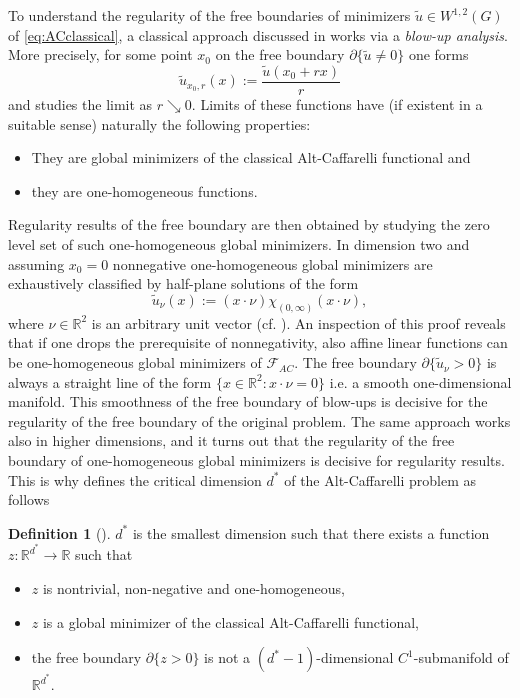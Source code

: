 \documentclass[twoside,11pt]{article}
\theoremstyle{definition}
\newtheorem{definition}{Definition}
\begin{document}
To understand the regularity of the free boundaries of minimizers $\tilde{u}\in W^{1,2}(G)$ of \eqref{eq:ACclassical}, a classical approach discussed in \cite{Velichkov} works via a \emph{blow-up analysis}. More precisely, for some point $x_0$ on the free boundary $\partial \{ \tilde{u} \neq 0 \}$ one forms 
\begin{equation}
    \tilde{u}_{x_0,r}(x) := \frac{\tilde{u}(x_0 + r x)}{r}
\end{equation}
and studies 
the limit as $r \searrow 0$. 
Limits of these functions have (if existent in a suitable sense) naturally the following properties:
\begin{itemize}
    \item They are global minimizers of the classical Alt-Caffarelli functional and 
    \item they are one-homogeneous functions. 
\end{itemize}
Regularity results of the free boundary are then obtained by studying the zero level set of such one-homogeneous global minimizers. In dimension two and assuming $x_0=0$ 
 nonnegative one-homogeneous global minimizers are exhaustively classified by half-plane solutions of the form 
\begin{equation*}
    \tilde{u}_\nu(x) := (x \cdot \nu) \chi_{(0,\infty)}(x\cdot \nu),
\end{equation*}
where $\nu \in \mathbb{R}^2$ is an arbitrary unit vector (cf. \cite[Proposition 9.13]{Velichkov}). An inspection of this proof reveals that if one drops the prerequisite of nonnegativity, also affine linear functions can be one-homogeneous global minimizers of $\mathcal{F}_{AC}$.     
The free boundary  $\partial\{\tilde{u}_\nu>0\}$ is always a straight line 
of the form $\{x \in \mathbb{R}^2: x \cdot \nu = 0 \}$ i.e. a smooth one-dimensional manifold. This smoothness of the free boundary of blow-ups is decisive for the regularity of the free boundary of the original problem. The same approach works also in higher dimensions, and it turns out that the regularity of the free boundary of one-homogeneous global minimizers is decisive for regularity results. This is why \cite{Velichkov} defines the critical dimension $d^*$ of the Alt-Caffarelli problem as follows
\begin{definition}[{\cite[Definition 1.5]{Velichkov}}]\label{eq:defcriticaldim} $d^*$ is the smallest dimension such that there exists a function $z: \mathbb{R}^{d^*} \rightarrow \mathbb{R}$ such that 
\begin{itemize}
    \item[(i)] $z$ is nontrivial, non-negative and one-homogeneous,
    \item[(ii)] $z$ is a global minimizer of the classical Alt-Caffarelli functional,
    \item[(iii)] the 
    free boundary $\partial \{ z > 0 \}$ is not a $(d^*-1)$-dimensional $C^1$-submanifold of $\mathbb{R}^{d^*}$. 
\end{itemize}
\end{definition}
\end{document}
